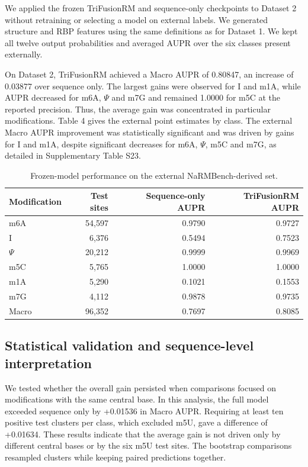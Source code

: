 \documentclass[unnumsec,webpdf,contemporary,large]{oup-authoring-template}
\begin{document}
We applied the frozen TriFusionRM and sequence-only checkpoints to Dataset 2 without retraining or selecting a model on external labels. We generated structure and RBP features using the same definitions as for Dataset 1. We kept all twelve output probabilities and averaged AUPR over the six classes present externally. 

On Dataset 2, TriFusionRM achieved a Macro AUPR of 0.80847, an increase of 0.03877 over sequence only. The largest gains were observed for I and m1A, while AUPR decreased for m6A, $\Psi$ and m7G and remained 1.0000 for m5C at the reported precision. Thus, the average gain was concentrated in particular modifications. Table 4 gives the external point estimates by class. The external Macro AUPR improvement was statistically significant and was driven by gains for I and m1A, despite significant decreases for m6A, $\Psi$, m5C and m7G, as detailed in Supplementary Table S23.

\begin{table}[!ht]
\caption{Frozen-model performance on the external NaRMBench-derived set.}\centering
\fontsize{7.5}{9}\selectfont
\setlength{\tabcolsep}{3pt}
\setlength{\arrayrulewidth}{0.5pt}
\renewcommand{\arraystretch}{1.18}
\begin{tabular}{lrrr}
\hline
Modification & Test sites & Sequence-only AUPR & TriFusionRM AUPR \\
\hline
m6A & 54,597 & 0.9790 & 0.9727 \\
I & 6,376 & 0.5494 & 0.7523 \\
$\Psi$ & 20,212 & 0.9999 & 0.9969 \\
m5C & 5,765 & 1.0000 & 1.0000 \\
m1A & 5,290 & 0.1021 & 0.1553 \\
m7G & 4,112 & 0.9878 & 0.9735 \\
Macro & 96,352 & 0.7697 & 0.8085 \\
\hline
\end{tabular}
\end{table}

\subsection{Statistical validation and sequence-level interpretation}

We tested whether the overall gain persisted when comparisons focused on modifications with the same central base. In this analysis, the full model exceeded sequence only by +0.01536 in Macro AUPR. Requiring at least ten positive test clusters per class, which excluded m5U, gave a difference of +0.01634. These results indicate that the average gain is not driven only by different central bases or by the six m5U test sites. The bootstrap comparisons resampled clusters while keeping paired predictions together. 
\end{document}
